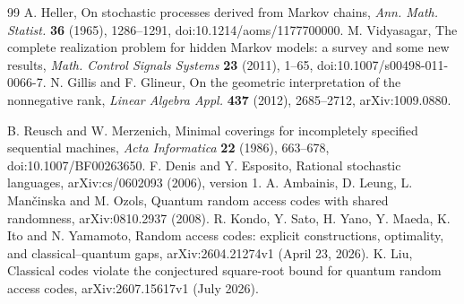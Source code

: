 \documentclass[11pt]{amsart}
\theoremstyle{definition}\newtheorem{definition}[theorem]{Definition}
\theoremstyle{remark}\newtheorem{remark}[theorem]{Remark}
\newcommand{\1}{\mathbf 1}
\begin{document}
\begin{thebibliography}{99}
 A. Heller, On stochastic processes derived from Markov chains,
\emph{Ann. Math. Statist.} \textbf{36} (1965), 1286--1291,
doi:10.1214/aoms/1177700000.
 M. Vidyasagar, The complete realization problem for
hidden Markov models: a survey and some new results,
\emph{Math. Control Signals Systems} \textbf{23} (2011), 1--65,
doi:10.1007/s00498-011-0066-7.
 N. Gillis and F. Glineur, On the geometric interpretation of
the nonnegative rank, \emph{Linear Algebra Appl.} \textbf{437} (2012),
2685--2712, arXiv:1009.0880.

 B. Reusch and W. Merzenich, Minimal coverings for
incompletely specified sequential machines, \emph{Acta Informatica}
\textbf{22} (1986), 663--678, doi:10.1007/BF00263650.
 F. Denis and Y. Esposito,
Rational stochastic languages, arXiv:cs/0602093 (2006), version 1.
 A. Ambainis, D. Leung, L. Man\v cinska and M. Ozols,
Quantum random access codes with shared randomness,
arXiv:0810.2937 (2008).
 R. Kondo, Y. Sato, H. Yano, Y. Maeda, K. Ito and
N. Yamamoto, Random access codes: explicit constructions, optimality,
and classical--quantum gaps, arXiv:2604.21274v1 (April 23, 2026).
 K. Liu, Classical codes violate the conjectured
square-root bound for quantum random access codes,
arXiv:2607.15617v1 (July 2026).

\end{thebibliography}
\end{document}
